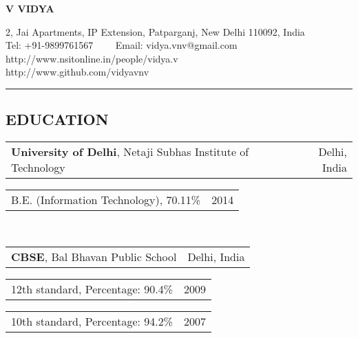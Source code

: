 \documentclass[10.5pt]{article}
\makeatletter
\newcommand{\headerrow}[2]
{\begin{tabular*}{\linewidth}{l@{\extracolsep{\fill}}r}
	#1 &
	#2 \\
\end{tabular*}}
\makeatother
\begin{document}
\begin{center}
{\LARGE \textbf{V VIDYA}}

2, Jai Apartments, IP Extension, Patparganj, New Delhi 110092, India
\\
Tel: +91-9899761567\ \ \textbullet
\ \ Email: vidya.vnv@gmail.com
\\http://www.nsitonline.in/people/vidya.v
\\http://www.github.com/vidyavnv
\end{center}
\vspace{-0.2em}
\hrule
\vspace{-0.2em}
\vspace{-0.5em}
\normalsize
\subsection*{EDUCATION}
\vspace{-3pt}
\headerrow
		{\textbf{University of Delhi}, Netaji Subhas Institute of Technology}
                {Delhi, India}
\headerrow
               {B.E. (Information Technology), 70.11\%}
               {2014}
\\[0.07in]
\headerrow
		{\textbf{CBSE}, Bal Bhavan Public School}
                {Delhi, India}
\headerrow
{12th standard,    Percentage: 90.4\%}
{2009}
\headerrow
{10th standard,    Percentage: 94.2\% }
{2007}	
	
	
\end{document}
